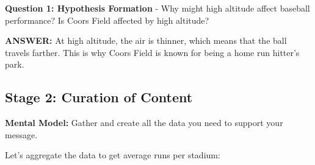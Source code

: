 \documentclass[
  letterpaper,
  DIV=11,
  numbers=noendperiod]{scrartcl}
\begin{document}
\begin{tcolorbox}[enhanced jigsaw, rightrule=.15mm, coltitle=black, colbacktitle=quarto-callout-important-color!10!white, opacitybacktitle=0.6, arc=.35mm, leftrule=.75mm, colback=white, title=\textcolor{quarto-callout-important-color}{\faExclamation}\hspace{0.5em}{🤔 Discussion Questions: Stage 1 - Declaration of Purpose}, colframe=quarto-callout-important-color-frame, bottomrule=.15mm, left=2mm, opacityback=0, toptitle=1mm, titlerule=0mm, toprule=.15mm, bottomtitle=1mm, breakable]

\textbf{Question 1: Hypothesis Formation} - Why might high altitude
affect baseball performance? Is Coors Field affected by high altitude?

\end{tcolorbox}

\textbf{ANSWER:} At high altitude, the air is thinner, which means that
the ball travels farther. This is why Coors Field is known for being a
home run hitter's park.

\subsection{Stage 2: Curation of
Content}\label{stage-2-curation-of-content}

\textbf{Mental Model:} Gather and create all the data you need to
support your message.

Let's aggregate the data to get average runs per stadium:
\end{document}
